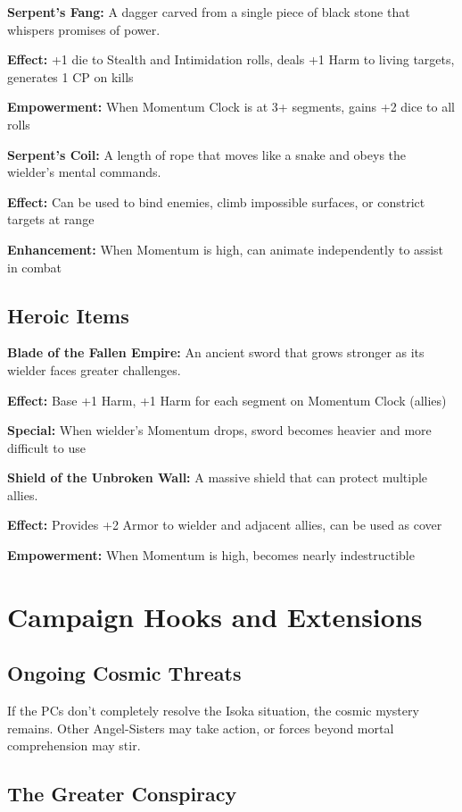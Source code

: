 \documentclass[12pt,twoside]{article}
\begin{document}
\textbf{Serpent's Fang:}
A dagger carved from a single piece of black stone that whispers promises of power.

\textbf{Effect:} +1 die to Stealth and Intimidation rolls, deals +1 Harm to living targets, generates 1 CP on kills

\textbf{Empowerment:} When Momentum Clock is at 3+ segments, gains +2 dice to all rolls

\textbf{Serpent's Coil:}
A length of rope that moves like a snake and obeys the wielder's mental commands.

\textbf{Effect:} Can be used to bind enemies, climb impossible surfaces, or constrict targets at range

\textbf{Enhancement:} When Momentum is high, can animate independently to assist in combat

\subsection{Heroic Items}

\textbf{Blade of the Fallen Empire:}
An ancient sword that grows stronger as its wielder faces greater challenges.

\textbf{Effect:} Base +1 Harm, +1 Harm for each segment on Momentum Clock (allies)

\textbf{Special:} When wielder's Momentum drops, sword becomes heavier and more difficult to use

\textbf{Shield of the Unbroken Wall:}
A massive shield that can protect multiple allies.

\textbf{Effect:} Provides +2 Armor to wielder and adjacent allies, can be used as cover

\textbf{Empowerment:} When Momentum is high, becomes nearly indestructible

\section{Campaign Hooks and Extensions}

\subsection{Ongoing Cosmic Threats}

If the PCs don't completely resolve the Isoka situation, the cosmic mystery remains. Other Angel-Sisters may take action, or forces beyond mortal comprehension may stir.

\subsection{The Greater Conspiracy}
\end{document}
